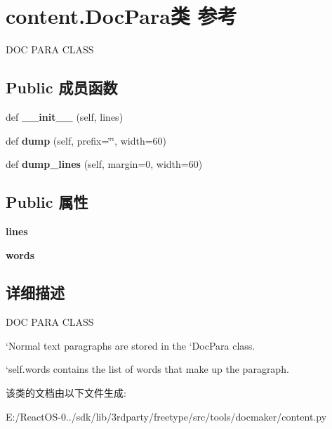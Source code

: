 \hypertarget{classcontent_1_1_doc_para}{}\section{content.\+Doc\+Para类 参考}
\label{classcontent_1_1_doc_para}


D\+OC P\+A\+RA C\+L\+A\+SS  


\subsection*{Public 成员函数}
\begin{DoxyCompactItemize}
\item 
\mbox{\label{classcontent_1_1_doc_para_a66d2e5801f561056bc1c52c975efd6d8}} 
def {\bfseries \+\_\+\+\_\+init\+\_\+\+\_\+} (self, lines)
\item 
\mbox{\label{classcontent_1_1_doc_para_aaf0b78eb406c88f9d2639055071284c4}} 
def {\bfseries dump} (self, prefix=\char`\"{}\char`\"{}, width=60)
\item 
\mbox{\label{classcontent_1_1_doc_para_a22cc63477a2c820ec82d7f5009d50ba0}} 
def {\bfseries dump\+\_\+lines} (self, margin=0, width=60)
\end{DoxyCompactItemize}
\subsection*{Public 属性}
\begin{DoxyCompactItemize}
\item 
\mbox{\label{classcontent_1_1_doc_para_aeba7e738c3e6d07306c9d2493e90b86c}} 
{\bfseries lines}
\item 
\mbox{\label{classcontent_1_1_doc_para_a0e61aa41cce302051b93b0f9af9665ef}} 
{\bfseries words}
\end{DoxyCompactItemize}


\subsection{详细描述}
D\+OC P\+A\+RA C\+L\+A\+SS 

`\+Normal\textquotesingle{} text paragraphs are stored in the `\+Doc\+Para\textquotesingle{} class.

`self.words\textquotesingle{} contains the list of words that make up the paragraph. 

该类的文档由以下文件生成\+:\begin{DoxyCompactItemize}
\item 
E\+:/\+React\+O\+S-\/0../sdk/lib/3rdparty/freetype/src/tools/docmaker/content.\+py\end{DoxyCompactItemize}
